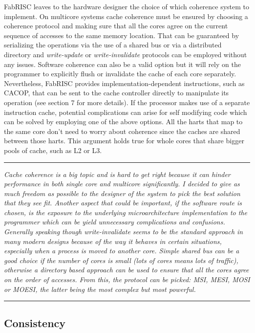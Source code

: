 \documentclass{article}
\begin{document}
            FabRISC leaves to the hardware designer the choice of which coherence system to implement. On multicore systems cache coherence must be ensured by choosing a coherence protocol and making sure that all the cores agree on the current sequence of accesses to the same memory location. That can be guaranteed by serializing the operations via the use of a shared bus or via a distributed directory and \textit{write-update} or \textit{write-invalidate} protocols can be employed without any issues. Software coherence can also be a valid option but it will rely on the programmer to explicitly flush or invalidate the cache of each core separately. Nevertheless, FabRISC provides implementation-dependent instructions, such as CACOP, that can be sent to the cache controller directly to manipulate its operation (see section 7 for more details). If the processor makes use of a separate instruction cache, potential complications can arise for self modifying code which can be solved by employing one of the above options. All the harts that map to the same core don't need to worry about coherence since the caches are shared between those harts. This argument holds true for whole cores that share bigger pools of cache, such as L2 or L3.

        \par\noindent\rule{\textwidth}{0.4pt}
        \textit{Cache coherence is a big topic and is hard to get right because it can hinder performance in both single core and multicore significantly. I decided to give as much freedom as possible to the designer of the system to pick the best solution that they see fit. Another aspect that could be important, if the software route is chosen, is the exposure to the underlying microarchitecture implementation to the programmer which can be yield unnecessary complications and confusions. Generally speaking though write-invalidate seems to be the standard approach in many modern designs because of the way it behaves in certain situations, especially when a process is moved to another core. Simple shared bus can be a good choice if the number of cores is small (lots of cores means lots of traffic), otherwise a directory based approach can be used to ensure that all the cores agree on the order of accesses. From this, the protocol can be picked: MSI, MESI, MOSI or MOESI, the latter being the most complex but most powerful.}
        \par\noindent\rule{\textwidth}{0.4pt}

        \subsection{Consistency}
\end{document}
